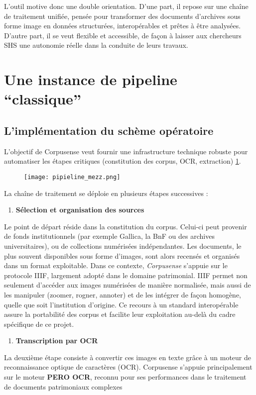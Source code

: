 L'outil motive donc une double orientation. D’une part, il repose sur une chaîne de traitement unifiée, pensée pour transformer des documents d’archives sous forme image en données structurées, interopérables et prêtes à être analysées. D’autre part, il se veut flexible et accessible, de façon à laisser aux chercheurs SHS une autonomie réelle dans la conduite de leurs travaux.

\section{Une instance de pipeline \enquote{classique}}

\subsection{L'implémentation du schème opératoire}

L’objectif de Corpusense veut fournir une infrastructure technique robuste pour automatiser les étapes critiques (constitution des corpus, OCR, extraction) \ref{fig:pipieline_mezz}.

\begin{figure}[htbp]
\centering
\texttt{[image: pipieline\_mezz.png]}
\caption{}
\label{fig:pipieline_mezz}
\end{figure}

La chaîne de traitement se déploie en plusieurs étapes successives :

\begin{enumerate}
\item \textbf{Sélection et organisation des sources}  
\end{enumerate}
   Le point de départ réside dans la constitution du corpus. Celui-ci peut provenir de fonds institutionnels (par exemple Gallica, la BnF ou des archives universitaires), ou de collections numérisées indépendantes. Les documents, le plus souvent disponibles sous forme d’images, sont alors recensés et organisés dans un format exploitable. Dans ce contexte, \emph{Corpusense} s’appuie sur le protocole IIIF, largement adopté dans le domaine patrimonial. IIIF permet non seulement d’accéder aux images numérisées de manière normalisée, mais aussi de les manipuler (zoomer, rogner, annoter) et de les intégrer de façon homogène, quelle que soit l’institution d’origine. Ce recours à un standard interopérable assure la portabilité des corpus et facilite leur exploitation au-delà du cadre spécifique de ce projet.

\begin{enumerate}
\item \textbf{Transcription par OCR}  
\end{enumerate}
   La deuxième étape consiste à convertir ces images en texte grâce à un moteur de reconnaissance optique de caractères (OCR). Corpusense s’appuie principalement sur le moteur \textbf{PERO OCR}, reconnu pour ses performances dans le traitement de documents patrimoniaux complexes

